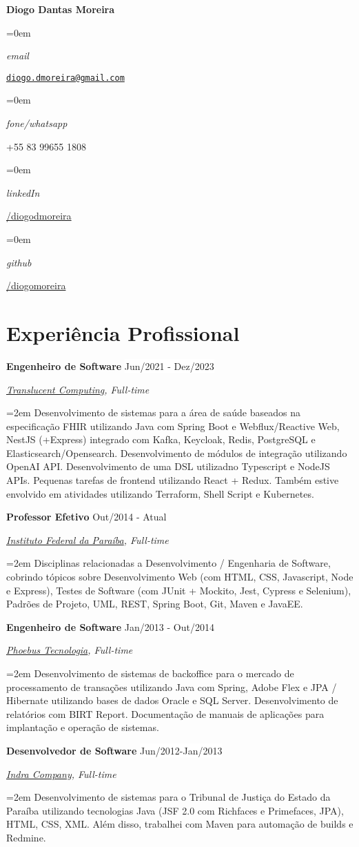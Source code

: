 \documentclass[a4paper,10pt]{article}
\newlength{\spacebox}
\newcommand{\Name}[1]{\noindent\huge\textbf{#1}\normalsize\normalfont}
\newcommand{\NewPart}[1]{\section*{\large{\textbf{#1}}}}
\newcommand{\PersonalEntry}[2]{
		\noindent\hangindent=0em\hangafter=0 		%
		\parbox{\spacebox}{							%
		\textit{#1}}								%
		\hspace{4.5em} #2 \par}						%
\newcommand{\EducationEntry}[4]{
		\noindent \textbf{#1} \hfill 					%
		\colorbox{White}{%
			\parbox{6em}{%
			\hfill\color{Black}#2}} \par				%
		\noindent \textit{#3} \par						%
		\noindent \hangindent=0em\hangafter=0 \normalsize #4 	%
		\normalsize \par
		\vspace{0.5em}
	}
\newcommand{\WorkEntry}[4]{								%
		\noindent \textbf{#1} \hfill 					%
		\colorbox{White}{\color{Black}#2} \par			%
		\noindent \textit{#3} \par						%
		\noindent\hangindent=2em\hangafter=0 \normalsize #4 	%
		\normalsize \par
		\vspace{0.5em}
	}
\begin{document}
\Name{Diogo Dantas Moreira}



\begin{multicols}{2}

\PersonalEntry{email}{\texttt{\href{mailto:diogo.dmoreira@gmail.com}{diogo.dmoreira@gmail.com}}}
\PersonalEntry{fone/whatsapp}{+55 83 99655 1808}
\PersonalEntry{linkedIn}{\href{http://br.linkedin.com/in/diogodmoreira/}{/diogodmoreira}}
\PersonalEntry{github}{\href{http://github.com/diogomoreira}{/diogomoreira}}
\end{multicols}

\NewPart{Experiência Profissional}

\WorkEntry{Engenheiro de Software}{Jun/2021 - Dez/2023}{\href{https://www.translucentcomputing.com/}{Translucent Computing}, Full-time}{Desenvolvimento de sistemas para a área de saúde baseados na especificação FHIR utilizando Java com Spring Boot e Webflux/Reactive Web, NestJS (+Express) integrado com Kafka, Keycloak, Redis, PostgreSQL e Elasticsearch/Opensearch. Desenvolvimento de módulos de integração utilizando OpenAI API. Desenvolvimento de uma DSL utilizadno Typescript e NodeJS APIs. Pequenas tarefas de frontend utilizando React + Redux. Também estive envolvido em atividades utilizando Terraform, Shell Script e Kubernetes.}

\WorkEntry{Professor Efetivo}{Out/2014 - Atual}{\href{https://www.ifpb.edu.br/}{Instituto Federal da Paraíba}, Full-time}{Disciplinas relacionadas a Desenvolvimento / Engenharia de Software, cobrindo tópicos sobre Desenvolvimento Web (com HTML, CSS, Javascript, Node e Express), Testes de Software (com JUnit + Mockito, Jest, Cypress e Selenium), Padrões de Projeto, UML, REST, Spring Boot, Git, Maven e JavaEE.}

\WorkEntry{Engenheiro de Software}{Jan/2013 - Out/2014}{\href{http://www.phoebus.com.br/}{Phoebus Tecnologia}, Full-time}{Desenvolvimento de sistemas de backoffice para o mercado de processamento de transações utilizando Java com Spring, Adobe Flex e JPA / Hibernate utilizando bases de dados Oracle e SQL Server. Desenvolvimento de relatórios com BIRT Report. Documentação de manuais de aplicações para implantação e operação de sistemas.}

\WorkEntry{Desenvolvedor de Software}{Jun/2012-Jan/2013}{\href{https://www.indracompany.com/es/pais/brasil}{Indra Company}, Full-time}{Desenvolvimento de sistemas para o Tribunal de Justiça do Estado da Paraíba utilizando tecnologias Java (JSF 2.0 com Richfaces e Primefaces, JPA), HTML, CSS, XML. Além disso, trabalhei com Maven para automação de builds e Redmine.}
\end{document}
